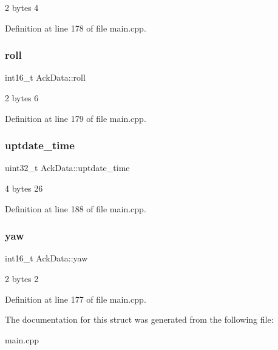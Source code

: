 2 bytes 4 



Definition at line 178 of file main.\+cpp.

\mbox{\label{structAckData_a9927c12b1934c847ddc3726f0d400208}} 
\subsubsection{\texorpdfstring{roll}{roll}}
{\footnotesize\ttfamily int16\+\_\+t Ack\+Data\+::roll}



2 bytes 6 



Definition at line 179 of file main.\+cpp.

\mbox{\label{structAckData_a577cc4e03ced6b2702d3a58260c05123}} 
\subsubsection{\texorpdfstring{uptdate\_time}{uptdate\_time}}
{\footnotesize\ttfamily uint32\+\_\+t Ack\+Data\+::uptdate\+\_\+time}



4 bytes 26 



Definition at line 188 of file main.\+cpp.

\mbox{\label{structAckData_ae33faf57319caab2179b12d7ed22dee7}} 
\subsubsection{\texorpdfstring{yaw}{yaw}}
{\footnotesize\ttfamily int16\+\_\+t Ack\+Data\+::yaw}



2 bytes 2 



Definition at line 177 of file main.\+cpp.



The documentation for this struct was generated from the following file\+:\begin{DoxyCompactItemize}
\item 
main.\+cpp\end{DoxyCompactItemize}
